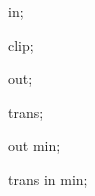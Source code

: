%
%

{
  

  \attribute in;

  \attribute clip;
  
  \attribute out;
  
  \attribute trans;

  \attribute out min;

  \attribute trans in min;

}
